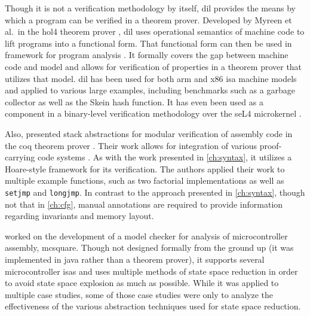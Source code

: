 Though it is not a verification methodology by itself,
\ac{dil} provides the means by which a program can be verified in a theorem prover.
Developed by Myreen et al.\ in the \gls{hol4} theorem prover \autocite{slind2008brief},
\ac{dil} uses operational semantics of machine code
to lift programs into a functional form.
That functional form can then be used in  framework
for program analysis \autocite{myreen2007hoare}.
It formally covers the gap between machine code and  model
and allows for verification of properties in a theorem prover that utilizes that model.
\Ac{dil} has been used for both \gls{arm} and \gls{x86} \ac{isa} machine models
and applied to various large examples,
including benchmarks such as a garbage collector as well as the Skein hash function.
It has even been used as a component in a binary-level verification methodology
over the seL4 microkernel \autocite{sewell2013tvv}.

Also, \textcite{feng2006modular,feng2005sbca} presented stack abstractions
for modular verification of assembly code
in the \gls{coq} theorem prover \autocite{chlipala2013certified}.
Their work allows for integration
of various proof-carrying code systems \autocite{necula1997proof}.
As with the work presented in \cref{ch:syntax},
it utilizes a Hoare-style framework for its verification.
The authors applied their work to multiple example functions,
such as two factorial implementations
as well as \lstinline|setjmp| and \lstinline|longjmp|.
In contrast to the approach presented in \cref{ch:syntax},
though not that in \cref{ch:cfg},
manual annotations are required to provide information
regarding invariants and memory layout.

\Textcite{schlich2008phd} worked on the development of a model checker for analysis
of microcontroller assembly, \gls{mcsquare}.
Though not designed formally from the ground up (it was implemented in \gls{java} rather than a theorem prover), it supports several microcontroller \acp{isa} and uses multiple methods of state space reduction in order to avoid state space explosion as much as possible.
While it was applied to multiple case studies,
some of those case studies were only to analyze the effectiveness
of the various abstraction techniques used for state space reduction.

